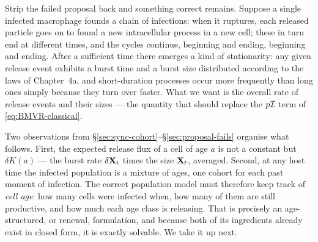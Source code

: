 Strip the failed proposal back and something correct remains. Suppose a
single infected macrophage founds a chain of infections: when it ruptures,
each released particle goes on to found a new intracellular process in a new
cell; these in turn end at different times, and the cycles continue,
beginning and ending, beginning and ending. After a sufficient time there
emerges a kind of stationarity: any given release event exhibits a burst
time and a burst size distributed according to the laws of Chapter~4a, and
short-duration processes occur more frequently than long ones simply
because they turn over faster. What we want
is the overall rate of release events and their sizes --- the quantity that
should replace the $p\mathcal{I}$ term of \eqref{eq:BMVR-classical}.

Two observations from \S\ref{sec:sync-cohort}--\S\ref{sec:proposal-fails}
organise what follows. First, the expected release flux of a cell of age
$a$ is not a constant but $\delta K(a)$ --- the burst rate $\delta{{\bf X}_t}$ times
the size ${{\bf X}_t}$, averaged. Second, at any host time the infected population
is a mixture of ages, one cohort for each past moment of infection. The
correct population model must therefore keep track of \emph{cell age}: how
many cells were infected when, how many of them are still productive, and
how much each age class is releasing. That is precisely an age-structured,
or renewal, formulation, and because both of its ingredients already exist
in closed form, it is exactly solvable. We take it up next.
